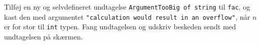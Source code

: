 \label{fac} Tilføj en ny og selvdefineret undtagelse \lstinline{ArgumentTooBig of string} til \lstinline{fac}, og kast den med argumentet \lstinline{"calculation would result in an overflow"}, når $n$ er for stor til \lstinline{int} typen. Fang undtagelsen og udskriv beskeden sendt med undtagelsen på skærmen.